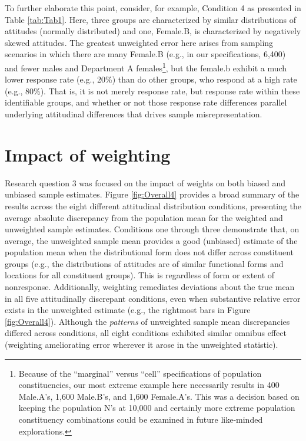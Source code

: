 \documentclass[
  man,mask]{apa7}
\begin{document}
To further elaborate this point, consider, for example, Condition 4 as presented in Table \ref{tab:Tab1}. Here, three groups are characterized by similar distributions of attitudes (normally distributed) and one, Female.B, is characterized by negatively skewed attitudes. The greatest unweighted error here arises from sampling scenarios in which there are many Female.B (e.g., in our specifications, 6,400) and fewer males and Department A females\footnote{Because of the ``marginal'' versus ``cell'' specifications of population constituencies, our most extreme example here necessarily results in 400 Male.A's, 1,600 Male.B's, and 1,600 Female.A's. This was a decision based on keeping the population N's at 10,000 and certainly more extreme population constituency combinations could be examined in future like-minded explorations.}, but the female.b exhibit a much lower response rate (e.g., 20\%) than do other groups, who respond at a high rate (e.g., 80\%). That is, it is not merely response rate, but response rate within these identifiable groups, and whether or not those response rate differences parallel underlying attitudinal differences that drives sample misrepresentation.

\section{Impact of weighting}\label{impact-of-weighting}

Research question 3 was focused on the impact of weights on both biased and unbiased sample estimates. Figure \ref{fig:Overall4} provides a broad summary of the results across the eight different attitudinal distribution conditions, presenting the average absolute discrepancy from the population mean for the weighted and unweighted sample estimates. Conditions one through three demonstrate that, on average, the unweighted sample mean provides a good (unbiased) estimate of the population mean when the distributional form does not differ across constituent groups (e.g., the distributions of attitudes are of similar functional forms and locations for all constituent groups). This is regardless of form or extent of nonresponse. Additionally, weighting remediates deviations about the true mean in all five attitudinally discrepant conditions, even when substantive relative error exists in the unweighted estimate (e.g., the rightmost bars in Figure \ref{fig:Overall4}). Although the \emph{patterns} of unweighted sample mean discrepancies differed across conditions, all eight conditions exhibited similar omnibus effect (weighting ameliorating error wherever it arose in the unweighted statistic).
\end{document}
